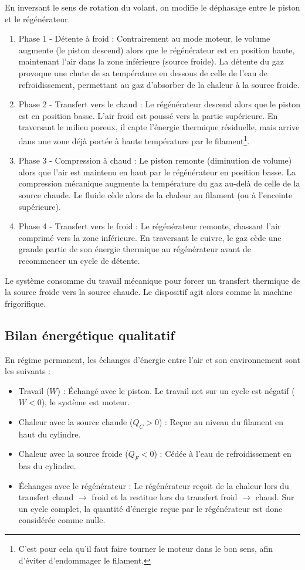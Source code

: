 \documentclass[a4paper,9pt,french]{scrartcl}
\begin{document}
En inversant le sens de rotation du volant, on modifie le déphasage entre le piston et le régénérateur. 
\begin{enumerate}
    \item {Phase 1 - Détente à froid :} Contrairement au mode moteur, le volume augmente (le piston descend) alors que le régénérateur est en position haute, maintenant l'air dans la zone inférieure (source froide). La détente du gaz provoque une chute de sa température en dessous de celle de l'eau de refroidissement, permettant au gaz d'absorber de la chaleur à la source froide.
    
    \item {Phase 2 - Transfert vers le chaud :} Le régénérateur descend alors que le piston est en position basse. L'air froid est poussé vers la partie supérieure. En traversant le milieu poreux, il capte l'énergie thermique résiduelle, mais arrive dans une zone déjà portée à haute température par le filament\footnote{C'est pour cela qu'il faut faire tourner le moteur dans le bon sens, afin d'éviter d'endommager le filament.}.
    
    \item {Phase 3 - Compression à chaud :} Le piston remonte (diminution de volume) alors que l'air est maintenu en haut par le régénérateur en position basse. La compression mécanique augmente la température du gaz au-delà de celle de la source chaude. Le fluide cède alors de la chaleur au filament (ou à l'enceinte supérieure).
    
    \item {Phase 4 - Transfert vers le froid :} Le régénérateur remonte, chassant l'air comprimé vers la zone inférieure. En traversant le cuivre, le gaz cède une grande partie de son énergie thermique au régénérateur avant de recommencer un cycle de détente.
\end{enumerate}
Le système consomme du travail mécanique pour forcer un transfert thermique de la source froide vers la source chaude. Le dispositif agit alors comme la {machine frigorifique}.
\subsection{Bilan énergétique qualitatif}
En régime permanent, les échanges d'énergie entre l'air et son environnement sont les suivants :
\begin{itemize}
    \item {Travail ($W$) :} Échangé avec le piston. Le travail net sur un cycle est négatif ($W < 0$), le système est moteur.
    \item {Chaleur avec la source chaude ($Q_C > 0$) :} Reçue au niveau du filament en haut du cylindre.
    \item {Chaleur avec la source froide ($Q_F < 0$) :} Cédée à l'eau de refroidissement en bas du cylindre.
    \item {Échanges avec le régénérateur :} Le régénérateur reçoit de la chaleur lors du transfert chaud $\to$ froid et la restitue lors du transfert froid $\to$ chaud. Sur un cycle complet, la quantité d'énergie reçue par le régénérateur est donc considérée comme nulle.
\end{itemize}
\end{document}
